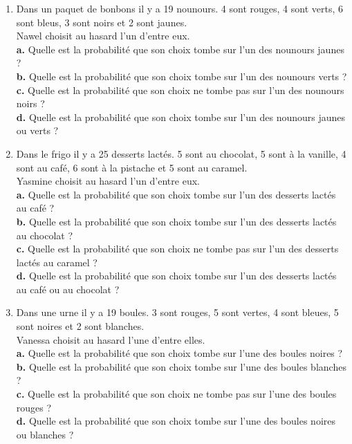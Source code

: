 {\begin{Exercice}
\leavevmode\vspace{-\baselineskip}
\begin{enumerate}[itemsep=1em]
	\item \begin{minipage}[t]{\linewidth}Dans un paquet de bonbons il y a 19 nounours. 4 sont rouges, 4 sont verts, 6 sont bleus, 3 sont noirs et 2 sont jaunes.\\ Nawel choisit au hasard l'un d'entre eux.\\ \textbf {a.}  Quelle est la probabilité que son choix tombe sur l'un des nounours jaunes ?\\\textbf {b.}  Quelle est la probabilité que son choix tombe sur l'un des nounours verts ?\\\textbf {c.}  Quelle est la probabilité que son choix ne tombe pas sur l'un des nounours noirs ?\\\textbf {d.}  Quelle est la probabilité que son choix tombe sur l'un des nounours jaunes ou verts ?\\\end{minipage}
	\item \begin{minipage}[t]{\linewidth}Dans le frigo il y a 25 desserts lactés. 5 sont au chocolat, 5 sont à la vanille, 4 sont au café, 6 sont à la pistache et 5 sont au caramel.\\ Yasmine choisit au hasard l'un d'entre eux.\\ \textbf {a.}  Quelle est la probabilité que son choix tombe sur l'un des desserts lactés au café ?\\\textbf {b.}  Quelle est la probabilité que son choix tombe sur l'un des desserts lactés au chocolat ?\\\textbf {c.}  Quelle est la probabilité que son choix ne tombe pas sur l'un des desserts lactés au caramel ?\\\textbf {d.}  Quelle est la probabilité que son choix tombe sur l'un des desserts lactés au café ou au chocolat ?\\\end{minipage}
	\item \begin{minipage}[t]{\linewidth}Dans une urne il y a 19 boules. 3 sont rouges, 5 sont vertes, 4 sont bleues, 5 sont noires et 2 sont blanches.\\ Vanessa choisit au hasard l'une d'entre elles.\\ \textbf {a.}  Quelle est la probabilité que son choix tombe sur l'une des boules noires ?\\\textbf {b.}  Quelle est la probabilité que son choix tombe sur l'une des boules blanches ?\\\textbf {c.}  Quelle est la probabilité que son choix ne tombe pas sur l'une des boules rouges ?\\\textbf {d.}  Quelle est la probabilité que son choix tombe sur l'une des boules noires ou blanches ?\\\end{minipage}

\end{enumerate}
\end{Exercice}}
